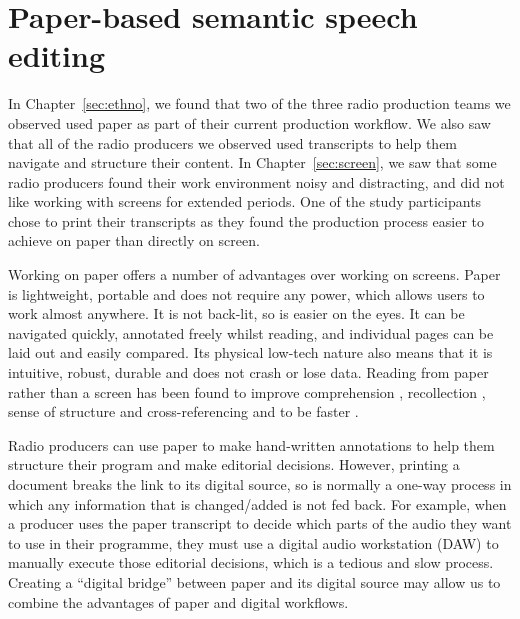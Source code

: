 \chapter{Paper-based semantic speech editing}\label{sec:paper}

In Chapter~\ref{sec:ethno}, we found that two of the three radio production teams we observed used paper as part of
their current production workflow.  We also saw that all of the radio producers we observed used transcripts to help
them navigate and structure their content.  In Chapter~\ref{sec:screen}, we saw that some radio producers found their
work environment noisy and distracting, and did not like working with screens for extended periods.  One of the study
participants chose to print their transcripts as they found the production process easier to achieve on paper than
directly on screen.


Working on paper offers a number of advantages over working on screens.  Paper is lightweight, portable and does not
require any power, which allows users to work almost anywhere.  It is not back-lit, so is easier on the eyes.  It can
be navigated quickly, annotated freely whilst reading, and individual pages can be laid out and easily compared.  Its
physical low-tech nature also means that it is intuitive, robust, durable and does not crash or lose data.  Reading
from paper rather than a screen has been found to improve comprehension \citep{Mangen2013}, recollection
\citep{Singer2017}, sense of structure and cross-referencing \citep{OHara1997} and to be faster \citep{Kurniawan2001}.

Radio producers can use paper to make hand-written annotations to help them structure their program and make editorial
decisions.  However, printing a document breaks the link to its digital source, so is normally a one-way process in
which any information that is changed/added is not fed back.  For example, when a producer uses the paper transcript to
decide which parts of the audio they want to use in their programme, they must use a digital audio workstation (DAW) to
manually execute those editorial decisions, which is a tedious and slow process.  Creating a ``digital bridge'' between
paper and its digital source may allow us to combine the advantages of paper and digital workflows.


